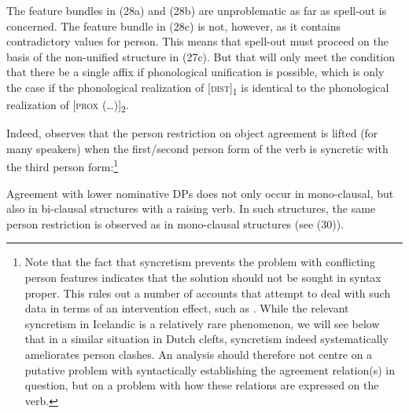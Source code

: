 \documentclass[output=paper]{langsci/langscibook}
\begin{document}
The feature bundles in (28a) and (28b) are unproblematic as far as spell-out is concerned. The feature bundle in (28c) is not, however, as it contains contradictory values for person. This means that spell-out must proceed on the basis of the non-unified structure in (27c). But that will only meet the condition that there be a single affix if phonological unification is possible, which is only the case if the phonological realization of [\textsc{dist}]\textsubscript{1} is identical to the phonological realization of [\textsc{prox} (…)]\textsubscript{2}.

Indeed, \citet{Sigurðsson1996} observes that the person restriction on object agreement is lifted (for many speakers) when the first/second person form of the verb is syncretic with the third person form:\footnote{Note that the fact that syncretism prevents the problem with conflicting person features indicates that the solution should not be sought in syntax proper. This rules out a number of accounts that attempt to deal with such data in terms of an intervention effect, such as \citealt{Sigurðsson2008}. While the relevant syncretism in Icelandic is a relatively rare phenomenon, we will see below that in a similar situation in Dutch clefts, syncretism indeed systematically ameliorates person clashes. An analysis should therefore not centre on a putative problem with syntactically establishing the agreement relation(s) in question, but on a problem with how these relations are expressed on the verb.}

\ea \judgewidth{\%} 
\z \z

Agreement with lower nominative DPs does not only occur in mono-clausal, but also in bi-clausal structures with a raising verb. In such structures, the same person restriction is observed as in mono-clausal structures (see (30)). 
\end{document}
